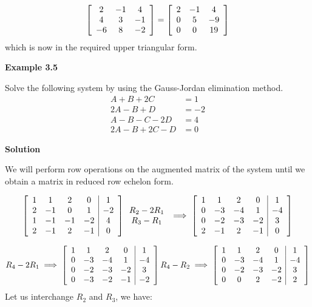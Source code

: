 \documentclass[a4paper, 12pt]{report}
\begin{document}
{     \[
     \left[ \begin{array}{c c c}
     2& -1& 4\\
     4& 3& -1\\
     -6& 8& -2
     \end{array} \right]
     =
     \left[ \begin{array}{c c c}
     2& -1& 4\\
     0& 5& -9\\
     0& 0& 19
     \end{array} \right]
     \]
     which is now in the required upper triangular form.\\
     \begin{center}
     	\textbf{Example 3.5}
     \end{center}
      Solve the following system by using the Gauss-Jordan elimination method.    
     \begin{align*}
     A+B+2C&=1\\
     2A-B+D&=-2\\
     A-B-C-2D&=4\\
     2A-B+2C-D&=0
     \end{align*}
     \begin{center}
     	\textbf{Solution}
     \end{center}
      We will perform row operations on the augmented matrix of the system until we obtain a matrix in reduced row echelon form.
     
     \[
     \left[ \begin{array}{c c c c| c}
     1& 1& 2& 0& 1\\
     2& -1& 0& 1& -2\\
     1& -1& -1& -2& 4\\
     2& -1& 2& -1& 0
     \end{array} \right]
     \begin{array}{c}R_2-2R_1 \\ R_3-R_1 \end{array}
     \implies
     \left[ \begin{array}{c c c c| c}
     1& 1& 2& 0& 1\\
     0& -3& -4& 1& -4\\
     0& -2& -3& -2& 3\\
     2& -1& 2& -1& 0
     \end{array} \right]
     \]
     
     \[
     R_4-2R_1 \implies
     \left[ \begin{array}{c c c c| c}
     1& 1& 2& 0& 1\\
     0& -3& -4& 1& -4\\
     0& -2& -3& -2& 3\\
     0& -3& -2& -1& -2
     \end{array} \right]
     R_4-R_2 \implies
     \left[ \begin{array}{c c c c| c}
     1& 1& 2& 0& 1\\
     0& -3& -4& 1& -4\\
     0& -2& -3& -2& 3\\
     0& 0& 2& -2& 2
     \end{array} \right]
     \]
     Let us interchange $R_2$ and $R_3$, we have:
     
}
\end{document}

